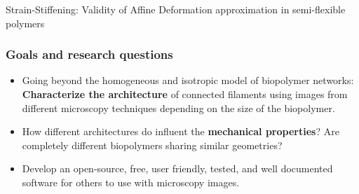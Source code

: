 \documentclass[10pt]{beamer}
\begin{document}
\begin{frame}{Strain-Stiffening: Validity of Affine Deformation approximation in semi-flexible polymers}
\end{frame}
\begin{frame}
  \frametitle{Goals and research questions}
  \begin{exampleblock}{}
  \begin{itemize}
    \item<1-> Going beyond the homogeneous and isotropic model of biopolymer networks: \textbf{Characterize the architecture} of connected filaments using images from different microscopy techniques depending on the size of the biopolymer.
    \item<2-> How different architectures do influent the \textbf{mechanical properties}? Are completely different biopolymers sharing similar geometries?
    \item<3-> Develop an open-source, free, user friendly, tested, and well documented software for others to use with microscopy images.
  \end{itemize}
  \end{exampleblock}
\end{frame}
\end{document}
